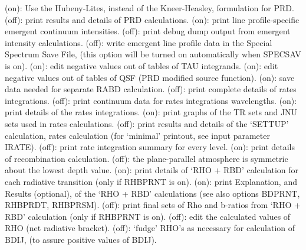 \space \vbox { (on): \bang
Use the Hubeny-Lites, instead of the Kneer-Heasley, formulation for PRD.}
\space \vbox { (off): \bang
print results and details of PRD calculations.}
\space \vbox { (on): \bang
print line profile-specific emergent continuum intensities.}
\space \vbox { (off): \bang
print debug dump output from emergent intensity calculations.}
\space \vbox { (off): \bang
write emergent line profile data in the Special Spectrum Save File,
(this option will be turned on automatically when SPECSAV is on).}
\space \vbox { (on): \bang
edit negative values out of tables of TAU integrands.}
\space \vbox { (on): \bang
edit negative values out of tables of QSF (PRD modified source function).}
\space \vbox { (on): \bang
save data needed for separate RABD calculation.}
\space \vbox { (off): \bang
print complete details of rates integrations.}
\space \vbox { (off): \bang 
print continuum data for rates integrations wavelengths.}
\space \vbox { (on): \bang
print details of the rates integrations.}
\space \vbox { (on): \bang
print graphs of the TR sets and JNU sets used in rates calculations.}
\space \vbox { (off): \bang
print results and details of the `SETTUP' calculation, \ie rates
calculation (for `minimal' printout, see input parameter IRATE).}
\space \vbox { (off): \bang
print rate integration summary for every level.}
\space \vbox { (on): \bang
print details of recombination calculation.}
\space \vbox { (off): \bang
the plane-parallel atmosphere is symmetric about the lowest depth value.}
\space \vbox { (on): \bang
print details of `RHO + RBD' calculation for each radiative transition 
(only if RHBPRNT is on).}
\space \vbox { (on): \bang
print Explanation, and Results (optional), of the `RHO + RBD' calculations 
(see also options BDPRNT, RHBPRDT, RHBPRSM).}
\space \vbox { (off): \bang
print final sets of Rho and b-ratios from `RHO + RBD' calculation 
(only if RHBPRNT is on).}
\space \vbox { (off): \bang
edit the calculated values of RHO (net radiative bracket).}
\space \vbox { (off): \bang
`fudge' RHO's as necessary for calculation of BDIJ, (to assure positive
values of BDIJ).}
